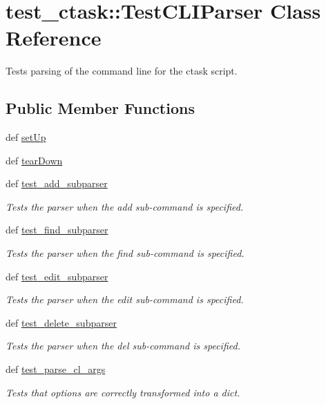 \hypertarget{classtest__ctask_1_1TestCLIParser}{
\section{test\-\_\-ctask\-:\-:\-Test\-C\-L\-I\-Parser \-Class \-Reference}
\label{classtest__ctask_1_1TestCLIParser}
}


\-Tests parsing of the command line for the ctask script.  


\subsection*{\-Public \-Member \-Functions}
\begin{DoxyCompactItemize}
\item 
def \hyperlink{classtest__ctask_1_1TestCLIParser_a507a2360d4625c0ac2796922e1ddf234}{set\-Up}
\item 
def \hyperlink{classtest__ctask_1_1TestCLIParser_aaf67790ad2019e0c6276f6cd31e9772f}{tear\-Down}
\item 
def \hyperlink{classtest__ctask_1_1TestCLIParser_a43a3f726777a6da32d25c99414bc3f9c}{test\-\_\-add\-\_\-subparser}
\begin{DoxyCompactList}\small\item\em \-Tests the parser when the add sub-\/command is specified. \end{DoxyCompactList}\item 
def \hyperlink{classtest__ctask_1_1TestCLIParser_ad22057a0ab9f441fa310df6df92a3936}{test\-\_\-find\-\_\-subparser}
\begin{DoxyCompactList}\small\item\em \-Tests the parser when the find sub-\/command is specified. \end{DoxyCompactList}\item 
def \hyperlink{classtest__ctask_1_1TestCLIParser_a593d3e9a39a5cc841ddfc11f0a66a7a1}{test\-\_\-edit\-\_\-subparser}
\begin{DoxyCompactList}\small\item\em \-Tests the parser when the edit sub-\/command is specified. \end{DoxyCompactList}\item 
def \hyperlink{classtest__ctask_1_1TestCLIParser_ae7b9fc02fb443d54923fe2d90407913b}{test\-\_\-delete\-\_\-subparser}
\begin{DoxyCompactList}\small\item\em \-Tests the parser when the del sub-\/command is specified. \end{DoxyCompactList}\item 
def \hyperlink{classtest__ctask_1_1TestCLIParser_a41937c1107d8a1d4dd2bcc54e9c8f3c1}{test\-\_\-parse\-\_\-cl\-\_\-args}
\begin{DoxyCompactList}\small\item\em \-Tests that options are correctly transformed into a dict. \end{DoxyCompactList}\end{DoxyCompactItemize}

